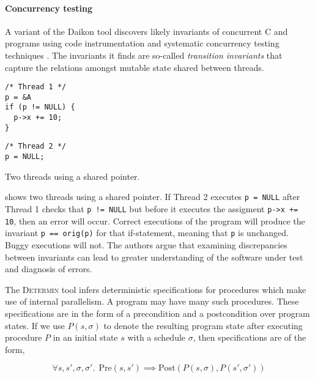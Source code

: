 \paragraph{Concurrency testing}
A variant of the Daikon tool discovers likely invariants of concurrent
C and \CPP{} programs using code instrumentation and systematic
concurrency testing techniques \parencite{kusano2015}.  The invariants it
finds are so-called \emph{transition invariants} that capture the
relations amongst mutable state shared between threads.

\begin{listing}
\centering
\begin{minipage}[t]{0.3\textwidth}
\begin{verbatim}
/* Thread 1 */
p = &A
if (p != NULL) {
  p->x += 10;
}
\end{verbatim}
\end{minipage}
\begin{minipage}[t]{0.3\textwidth}
\begin{verbatim}
/* Thread 2 */
p = NULL;
\end{verbatim}
\end{minipage}
\caption{Two threads using a shared pointer.}\label{lst:cthreads}
\end{listing}

 shows two threads using a shared pointer.  If
Thread 2 executes \verb|p = NULL| after Thread 1 checks that
\verb|p != NULL| but before it executes the assigment
\verb|p->x += 10|, then an error will occur.  Correct executions of
the program will produce the invariant \verb|p == orig(p)| for that
if-statement, meaning that \verb|p| is unchanged.  Buggy executions
will not.  The authors argue that examining discrepancies between
invariants can lead to greater understanding of the software under
test and diagnosis of errors.

The \textsc{Determin} tool \parencite{burnim2010} infers deterministic
specifications for procedures which make use of internal parallelism.
A program may have many such procedures.  These specifications are in
the form of a precondition and a postcondition over program states.
If we use $P(s, \sigma)$ to denote the resulting program state after
executing procedure $P$ in an initial state $s$ with a schedule
$\sigma$, then specifications are of the form,

\[
\forall s, s', \sigma, \sigma'.~~
\mathrm{Pre}\left(s, s'\right) \implies
\mathrm{Post}\left(P\left(s,\sigma\right),P\left(s', \sigma'\right)\right)
\]

